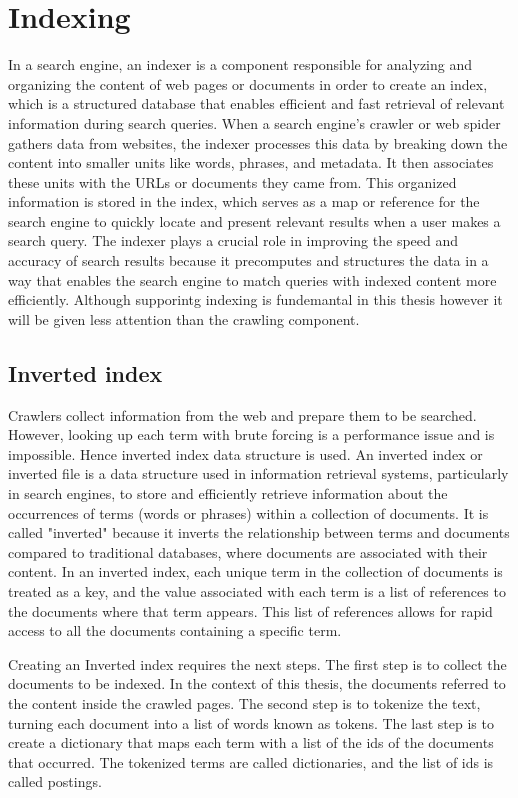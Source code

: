 \section{Indexing}
\label{sec:indexing}
In a search engine, an indexer is a component responsible for analyzing and organizing the content of web pages or documents in order to create an index, which is a structured database that enables efficient and fast retrieval of relevant information during search queries.
When a search engine's crawler or web spider gathers data from websites, the indexer processes this data by breaking down the content into smaller units like words, phrases, and metadata. It then associates these units with the URLs or documents they came from. This organized information is stored in the index, which serves as a map or reference for the search engine to quickly locate and present relevant results when a user makes a search query.
The indexer plays a crucial role in improving the speed and accuracy of search results because it precomputes and structures the data in a way that enables the search engine to match queries with indexed content more efficiently. Although supporintg indexing is fundemantal in this thesis however it will be given less attention than the crawling component. 

\subsection{Inverted index}
Crawlers collect information from the web and prepare them to be searched. However, looking up each term with brute forcing is a performance issue and is impossible. Hence inverted index data structure is used. 
An inverted index or inverted file is a data structure used in information retrieval systems, particularly in search engines, to store and efficiently retrieve information about the occurrences of terms (words or phrases) within a collection of documents. It is called "inverted" because it inverts the relationship between terms and documents compared to traditional databases, where documents are associated with their content.
In an inverted index, each unique term in the collection of documents is treated as a key, and the value associated with each term is a list of references to the documents where that term appears. This list of references allows for rapid access to all the documents containing a specific term.

Creating an Inverted index requires the next steps. The first step is to collect the documents to be indexed. In the context of this thesis, the documents referred to the content inside the crawled pages. The second step is to tokenize the text, turning each document into a list of words known as tokens. The last step is to create a dictionary that maps each term with a list of the ids of the documents that occurred. The tokenized terms are called dictionaries, and the list of ids is called postings. 

